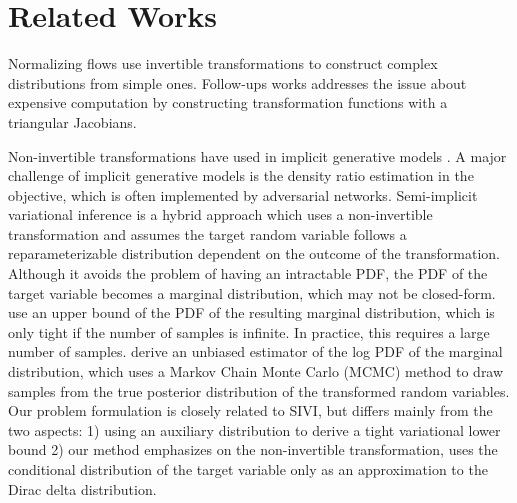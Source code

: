 \documentclass[twoside]{article}
\newcommand{\acr}[1]{\textsc{#1}\xspace}
\newcommand{\sivi}{\acr{SIVI}}
\begin{document}

\section{Related Works}

Normalizing flows \citep{JimenezRezendeMohamed2015} use invertible transformations to construct complex distributions from simple ones. Follow-ups works \citep{KingmaEtAl2016, DinhEtAl2017, HuangEtAl2018} addresses the issue about expensive computation by constructing transformation functions with a triangular Jacobians.

Non-invertible transformations have used in implicit generative models \citep{MohamedLakshminarayanan2016, NowozinEtAl2016, huszar2017, TranEtAl2017, LiTurner2018, MeschederEtAl2017, ShiEtAl2018, LueckmannEtAl2018}. A major challenge of implicit generative models is the density ratio estimation in the objective, which is often implemented by adversarial networks. Semi-implicit variational inference \citep{YinZhou2018, TitsiasRuiz2019, MolchanovEtAl2019} is a hybrid approach which uses a non-invertible transformation and assumes the target random variable follows a reparameterizable distribution dependent on the outcome of the transformation. Although it avoids the problem of having an intractable PDF, the PDF of the target variable becomes a marginal distribution, which may not be closed-form. \cite{YinZhou2018, MolchanovEtAl2019} use an upper bound of the PDF of the resulting marginal distribution, which is only tight if the number of samples is infinite. In practice, this requires a large number of samples. \cite{TitsiasRuiz2019} derive an unbiased estimator of the log PDF of the marginal distribution, which uses a Markov Chain Monte Carlo (MCMC) method to draw samples from the true posterior distribution of the transformed random variables. Our problem formulation is closely related to \sivi, but differs mainly from the two aspects: 1) using an auxiliary distribution to derive a tight variational lower bound 2) our method emphasizes on the non-invertible transformation, uses the conditional distribution of the target variable only as an approximation to the Dirac delta distribution.
\end{document}
